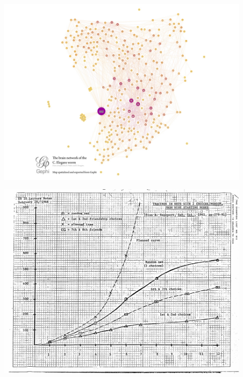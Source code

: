 \documentclass{beamer}
\def\vf{\vfill}
\begin{document}
\begin{frame}

\begin{center}
\includegraphics[width=0.95\textwidth]{figures/celegans_brain_network}
\end{center}

\vf
{}

\end{frame}
\begin{frame}

\begin{center}
\includegraphics[width=0.95\textwidth]{figures/white_classnotes_swt}
\end{center}

\end{frame}
\end{document}

